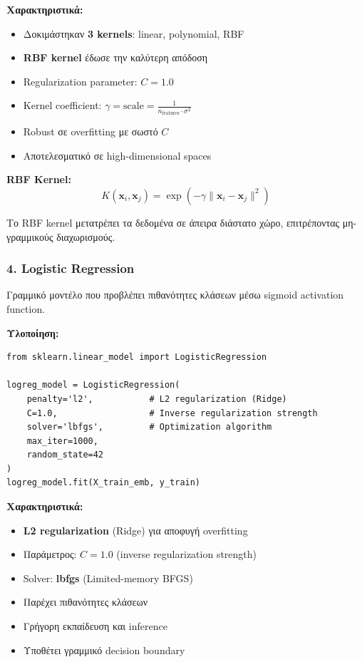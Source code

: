 \documentclass[12pt,a4paper,twoside]{book}
\begin{document}
\textbf{Χαρακτηριστικά:}
\begin{itemize}
    \item Δοκιμάστηκαν \textbf{3 kernels}: linear, polynomial, RBF
    \item \textbf{RBF kernel} έδωσε την καλύτερη απόδοση
    \item Regularization parameter: \(C = 1.0\)
    \item Kernel coefficient: \(\gamma = \text{scale} = \frac{1}{n_{\text{features}}
              \cdot \sigma^2}\)
    \item Robust σε overfitting με σωστό \(C\)
    \item Αποτελεσματικό σε high-dimensional spaces
\end{itemize}

\textbf{RBF Kernel:}
\begin{equation}
    K(\mathbf{x}_i, \mathbf{x}_j) = \exp\left(-\gamma \|\mathbf{x}_i - \mathbf{x}_j\|^2\right)
\end{equation}

Το RBF kernel μετατρέπει τα δεδομένα σε άπειρα διάστατο χώρο, επιτρέποντας μη-γραμμικούς διαχωρισμούς.

\subsubsection*{4. Logistic Regression}

Γραμμικό μοντέλο που προβλέπει πιθανότητες κλάσεων μέσω sigmoid activation function.

\textbf{Υλοποίηση:}
\begin{tcolorbox}[myCustomStyle={Logistic Regression}]
    \begin{lstlisting}[style=myPythonStyle]
from sklearn.linear_model import LogisticRegression

logreg_model = LogisticRegression(
    penalty='l2',           # L2 regularization (Ridge)
    C=1.0,                  # Inverse regularization strength
    solver='lbfgs',         # Optimization algorithm
    max_iter=1000,
    random_state=42
)
logreg_model.fit(X_train_emb, y_train)
\end{lstlisting}
\end{tcolorbox}

\textbf{Χαρακτηριστικά:}
\begin{itemize}
    \item \textbf{L2 regularization} (Ridge) για αποφυγή overfitting
    \item Παράμετρος: \(C = 1.0\) (inverse regularization strength)
    \item Solver: \textbf{lbfgs} (Limited-memory BFGS)
    \item Παρέχει πιθανότητες κλάσεων
    \item Γρήγορη εκπαίδευση και inference
    \item Υποθέτει γραμμικό decision boundary
\end{itemize}
\end{document}
